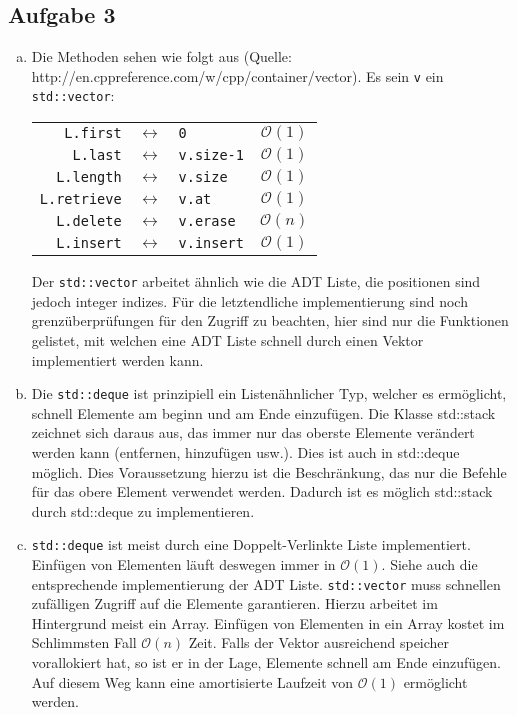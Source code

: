 \documentclass[11pt]{article}
\begin{document}
\subsection*{Aufgabe 3}
\begin{enumerate}[a)]
  \item 
    Die Methoden sehen wie folgt aus (Quelle: http://en.cppreference.com/w/cpp/container/vector). 
    Es sein \texttt{v} ein \texttt{std::vector}: 

    \begin{centering}
      \begin{tabular}{r c l c}
        \texttt{L.first}     & $\leftrightarrow$ & \texttt{0}       &   $\mathcal{O}(1)$\\
        \texttt{L.last}      & $\leftrightarrow$ & \texttt{v.size-1} &   $\mathcal{O}(1)$\\
        \texttt{L.length}    & $\leftrightarrow$ & \texttt{v.size  }   &   $\mathcal{O}(1)$\\
        \texttt{L.retrieve}  & $\leftrightarrow$ & \texttt{v.at    }   &   $\mathcal{O}(1)$\\
        \texttt{L.delete}    & $\leftrightarrow$ & \texttt{v.erase }  &   $\mathcal{O}(n)$\\
        \texttt{L.insert}    & $\leftrightarrow$ & \texttt{v.insert} &   $\mathcal{O}(1)$
      \end{tabular}
    \end{centering}

    Der \texttt{std::vector} arbeitet \"ahnlich wie die ADT Liste,
    die positionen sind jedoch integer indizes. F\"ur die letztendliche
    implementierung sind noch grenz\"uberpr\"ufungen f\"ur den Zugriff
    zu beachten, hier sind nur die Funktionen gelistet, mit welchen eine 
    ADT Liste schnell durch einen Vektor implementiert werden kann.
    

  \item

    Die \texttt{std::deque} ist prinzipiell ein Listen\"ahnlicher Typ,
    welcher es erm\"oglicht, schnell Elemente am beginn und am 
    Ende einzuf\"ugen.  Die Klasse std::stack zeichnet sich daraus
    aus, das immer nur das oberste Elemente verändert werden kann (entfernen,
    hinzufügen usw.). Dies ist auch in std::deque möglich. Dies Voraussetzung
    hierzu ist die Beschränkung, das nur die Befehle für das obere Element
    verwendet werden. Dadurch ist es möglich std::stack durch std::deque zu
    implementieren. 

  \item
    \texttt{std::deque} ist meist durch eine Doppelt-Verlinkte Liste
    implementiert. Einf\"ugen von Elementen l\"auft deswegen immer
    in $\mathcal{O}(1)$. Siehe auch die entsprechende
    implementierung der ADT Liste. \texttt{std::vector} muss
    schnellen zuf\"alligen Zugriff auf die Elemente garantieren. Hierzu
    arbeitet im Hintergrund meist ein Array. Einf\"ugen von Elementen
    in ein Array kostet im Schlimmsten Fall $\mathcal{O}(n)$ Zeit.
    Falls der Vektor ausreichend speicher vorallokiert hat, so
    ist er in der Lage, Elemente schnell am Ende einzuf\"ugen. Auf diesem Weg 
    kann eine amortisierte Laufzeit von $\mathcal{O}(1)$ erm\"oglicht werden.


\end{enumerate}
\end{document}
